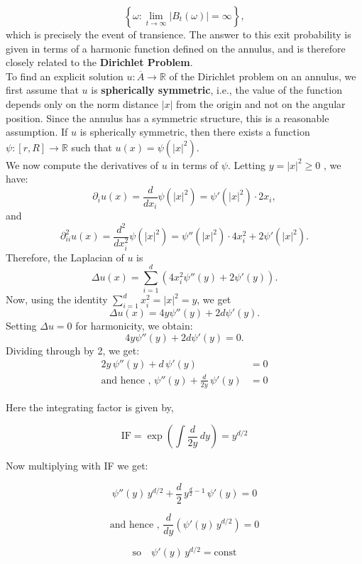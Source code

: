 \documentclass{article}
\numberwithin{equation}{section}
\begin{document}
\[
\left\{\omega : \lim_{t \to \infty} |B_t(\omega)| = \infty \right\},
\]
which is precisely the event of transience.
The answer to this exit probability is given in terms of a harmonic function defined on the annulus, and is therefore closely related to the \textbf{Dirichlet Problem}. \\
To find an explicit solution \( u : \overline{A} \to \mathbb{R} \) of the Dirichlet problem on an annulus, we first assume that \( u \) is \textbf{spherically symmetric}, i.e., the value of the function depends only on the norm distance \( |x| \) from the origin and not on the angular position. Since the annulus has a symmetric structure, this is a reasonable assumption.
If \( u \) is spherically symmetric, then there exists a function \( \psi : [r, R] \to \mathbb{R} \) such that \(u(x) = \psi(|x|^2).\) \\
We now compute the derivatives of \( u \) in terms of \( \psi \). Letting \( y = |x|^2 \geq 0 \) , we have:
\[
\partial_{i} u(x) = \frac{d}{dx_i} \psi(|x|^2) = \psi'(|x|^2) \cdot 2x_i,
\]
and
\[
\partial_{ii}^2 u(x) = \frac{d^2}{dx_i^2} \psi(|x|^2) = \psi''(|x|^2) \cdot 4x_i^2 + 2\psi'(|x|^2).
\]
Therefore, the Laplacian of \( u \) is
\[
\Delta u(x) = \sum_{i=1}^d \left( 4x_i^2 \psi''(y) + 2\psi'(y) \right).
\]
Now, using the identity \( \sum_{i=1}^d x_i^2 = |x|^2 = y \), we get
\[
\Delta u(x) = 4y \psi''(y) + 2d \psi'(y).
\]
Setting \( \Delta u = 0 \) for harmonicity, we obtain:
\[
4y \psi''(y) + 2d \psi'(y) = 0.
\]
Dividing through by 2, we get:
\begin{align*}
    2y \, \psi''(y) + d \, \psi'(y) &= 0 \\
    \text{and hence , } \psi''(y) + \frac{d}{2y} \, \psi'(y) &= 0
\end{align*}

Here the integrating factor is given by, 

\[
\text{IF} = \exp\left( \int \frac{d}{2y} \, dy \right) = y^{d/2}
\]

Now multiplying with IF we get:

\[
\psi''(y) \, y^{d/2} + \frac{d}{2} \, y^{\frac{d}{2}-1} \, \psi'(y) = 0
\]

\[
\text{and hence , }\frac{d}{dy} \left( \psi'(y) \, y^{d/2} \right) = 0
\]

\[
\text{so} \quad \psi'(y) \, y^{d/2} = \text{const}
\]
\end{document}

